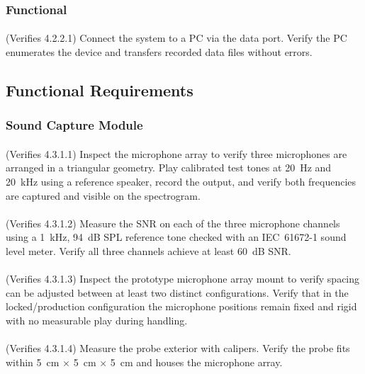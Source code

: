 \subsubsection{Functional}

\paragraph{}
(Verifies 4.2.2.1) Connect the system to a PC via the data port.  Verify the PC enumerates the device and transfers recorded data files without errors.

\subsection{Functional Requirements}

\subsubsection{Sound Capture Module}

\paragraph{}
(Verifies 4.3.1.1) Inspect the microphone array to verify three microphones are arranged in a triangular geometry.  Play calibrated test tones at 20~Hz and 20~kHz using a reference speaker, record the output, and verify both frequencies are captured and visible on the spectrogram.

\paragraph{}
(Verifies 4.3.1.2) Measure the SNR on each of the three microphone channels using a 1~kHz, 94~dB SPL reference tone checked with an IEC~61672-1 sound level meter.  Verify all three channels achieve at least 60~dB SNR.

\paragraph{}
(Verifies 4.3.1.3) Inspect the prototype microphone array mount to verify spacing can be adjusted between at least two distinct configurations.  Verify that in the locked/production configuration the microphone positions remain fixed and rigid with no measurable play during handling.

\paragraph{}
(Verifies 4.3.1.4) Measure the probe exterior with calipers.  Verify the probe fits within 5~cm $\times$ 5~cm $\times$ 5~cm and houses the microphone array.

